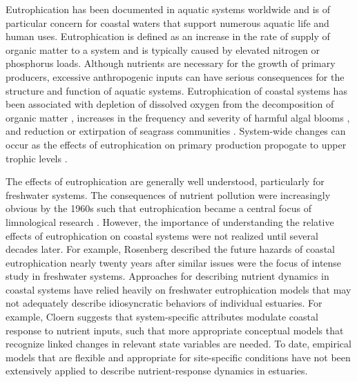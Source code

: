 \documentclass{svjour3}\usepackage[]{graphicx}\usepackage[]{color}
\begin{document}
Eutrophication has been documented in aquatic systems worldwide and is of particular concern for coastal waters that support numerous aquatic life and human uses.  Eutrophication is defined as an increase in the rate of supply of organic matter to a system \cite{Nixon95} and is typically caused by elevated nitrogen or phosphorus loads.  Although nutrients are necessary for the growth of primary producers, excessive anthropogenic inputs can have serious consequences for the structure and function of aquatic systems.  Eutrophication of coastal systems has been associated with depletion of dissolved oxygen from the decomposition of organic matter \cite{Diaz08}, increases in the frequency and severity of harmful algal blooms \cite{Glibert13}, and reduction or extirpation of seagrass communities \cite{Duarte95,Tomasko05}.  System-wide changes can occur as the effects of eutrophication on primary production propogate to upper trophic levels \cite{Powers05}. 

The effects of eutrophication are generally well understood, particularly for freshwater systems. The consequences of nutrient pollution were increasingly obvious by the 1960s such that eutrophication became a central focus of limnological research \cite{Cloern01}.  However, the importance of understanding the relative effects of eutrophication on coastal systems were not realized until several decades later.  For example, Rosenberg \cite{Rosenberg85} described the future hazards of coastal eutrophication nearly twenty years after similar issues were the focus of intense study in freshwater systems.  Approaches for describing nutrient dynamics in coastal systems have relied heavily on freshwater eutrophication models that may not adequately describe idiosyncratic behaviors of individual estuaries.  For example, Cloern \cite{Cloern01} suggests that system-specific attributes modulate coastal response to nutrient inputs, such that more appropriate conceptual models that recognize linked changes in relevant state variables are needed.  To date, empirical models that are flexible and appropriate for site-specific conditions have not been extensively applied to describe nutrient-response dynamics in estuaries.
\end{document}
